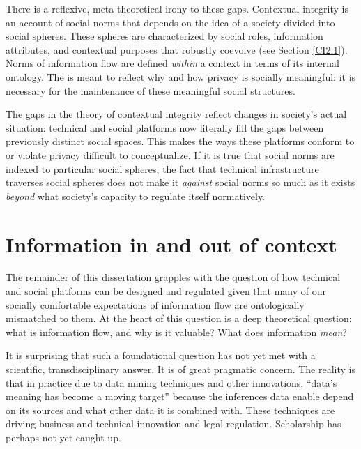 \documentclass[../thesis.tex]{subfiles}
\begin{document}
 There is a reflexive, meta-theoretical irony to these gaps.
 Contextual integrity is an account of social norms that
 depends on the idea of a society divided into social spheres.
 These spheres are characterized by social roles,
 information attributes, and contextual purposes that robustly
 coevolve (see Section \ref{CI2.1}).
 Norms of information flow are defined \textit{within} a context
 in terms of its internal ontology.
 The is meant to reflect why and how privacy is socially meaningful:
 it is necessary for the maintenance of these meaningful social structures.

 The gaps in the theory of contextual integrity reflect changes in society's actual situation: technical and social platforms now literally fill the gaps between previously distinct social spaces.
 This makes the ways these platforms conform to or violate privacy
 difficult to conceptualize.
 If it is true that social norms are indexed to particular social
 spheres, the fact that technical infrastructure traverses social spheres does not make it \textit{against} social norms so much as it exists \textit{beyond} what society's capacity to regulate itself normatively.

 \section{Information in and out of context}

 The remainder of this dissertation grapples with the question of how technical and social platforms can be designed and regulated given that many of our socially comfortable expectations of information flow are ontologically mismatched to them.
 At the heart of this question is a deep theoretical question:
 what is information flow, and why is it valuable?
 What does information \textit{mean}?

 It is surprising that such a foundational question has
 not yet met with a scientific, transdisciplinary answer.
 It is of great pragmatic concern.
 The reality is that in practice due to data mining techniques and
 other innovations, ``data's meaning has become a moving target''
 \cite{horvitz2015data} because the inferences data enable
 depend on its sources and what other data it is combined with.
 These techniques are driving business and technical innovation
 and legal regulation.
 Scholarship has perhaps not yet caught up.
\end{document}

